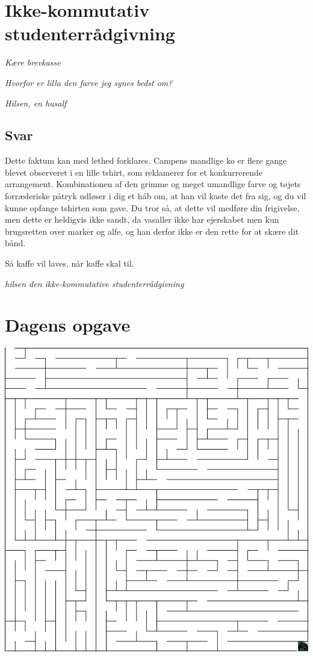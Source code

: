 \begin{minipage}[t]{170mm}
\vspace{3mm}
\section*{Ikke-kommutativ studenterrådgivning}
\emph{Kære brevkasse}

\emph{Hvorfor er  lilla den farve jeg synes bedst om?}

\emph{Hilsen, en husalf}

\subsection*{Svar}
Dette faktum kan med lethed forklares. Campens mandlige ko er flere gange blevet observeret i en lille tshirt, som reklamerer for et konkurrerende arrangement. Kombinationen af den grimme og meget umandlige farve og tøjets forræderiske påtryk udløser i dig et håb om, at han vil kaste det fra sig, og du vil kunne opfange tshirten som gave. Du tror så, at dette vil medføre din frigivelse, men dette er heldigvis ikke sandt, da vasaller ikke har ejerskabet men kun brugsretten over marker og alfe, og han derfor ikke er den rette for at skære dit bånd.

Så kaffe vil laves, når kaffe skal til.

{\flushright\emph{hilsen den ikke-kommutative studenterrådgivning}}
\vspace{3mm}
\section*{Dagens opgave}

\includegraphics[width=\textwidth]{mazemedfynbo.jpg}


\end{minipage}
